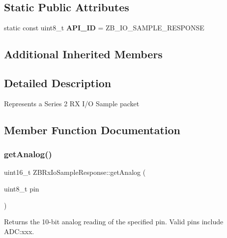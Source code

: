 \subsection*{Static Public Attributes}
\begin{DoxyCompactItemize}
\item 
\hypertarget{class_z_b_rx_io_sample_response_a700847e033b7359f5f93b1867461aa75}{}\label{class_z_b_rx_io_sample_response_a700847e033b7359f5f93b1867461aa75} 
static const uint8\+\_\+t {\bfseries A\+P\+I\+\_\+\+ID} = Z\+B\+\_\+\+I\+O\+\_\+\+S\+A\+M\+P\+L\+E\+\_\+\+R\+E\+S\+P\+O\+N\+SE
\end{DoxyCompactItemize}
\subsection*{Additional Inherited Members}


\subsection{Detailed Description}
Represents a Series 2 RX I/O Sample packet 

\subsection{Member Function Documentation}
\hypertarget{class_z_b_rx_io_sample_response_aa74edf46988bd3e50ce4037350cbb91e}{}\label{class_z_b_rx_io_sample_response_aa74edf46988bd3e50ce4037350cbb91e} 
\subsubsection{\texorpdfstring{get\+Analog()}{getAnalog()}}
{\footnotesize\ttfamily uint16\+\_\+t Z\+B\+Rx\+Io\+Sample\+Response\+::get\+Analog (\begin{DoxyParamCaption}\item[{uint8\+\_\+t}]{pin }\end{DoxyParamCaption})}

Returns the 10-\/bit analog reading of the specified pin. Valid pins include A\+DC\+:xxx. \hypertarget{class_z_b_rx_io_sample_response_ad0e444cc8854c996517c1ecde033a9c8}{}\label{class_z_b_rx_io_sample_response_ad0e444cc8854c996517c1ecde033a9c8} 
